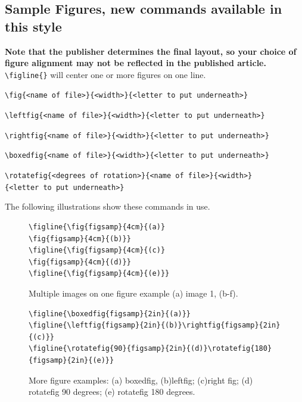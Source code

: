 \documentclass{JASA-EL}
\begin{document}
\subsection{Sample Figures, new commands available in this style}
\vskip12pt
{\bf Note that the publisher determines the final layout, so 
your choice of figure alignment may not be reflected in the published
article.}
\vskip24pt
\noindent
\verb+\figline{}+ will center one or more figures on one line. 


\noindent
\verb+\fig{<name of file>}{<width>}{<letter to put underneath>}+

\noindent
\verb+\leftfig{<name of file>}{<width>}{<letter to put underneath>}+

\noindent
\verb+\rightfig{<name of file>}{<width>}{<letter to put underneath>}+

\noindent
\verb+\boxedfig{<name of file>}{<width>}{<letter to put underneath>}+

\noindent
\verb+\rotatefig{<degrees of rotation>}{<name of file>}{<width>}+\\
\verb+{<letter to put underneath>}+

The following illustrations show these commands in use.

\begin{figure}[ht]
\begin{verbatim}
\figline{\fig{figsamp}{4cm}{(a)}
\fig{figsamp}{4cm}{(b)}}
\figline{\fig{figsamp}{4cm}{(c)}
\fig{figsamp}{4cm}{(d)}}
\figline{\fig{figsamp}{4cm}{(e)}}
\end{verbatim}


\caption{ \label{fig:pressure_field} Multiple images on one figure
example (a) image 1, (b-f).}
\end{figure}

\begin{figure}
\baselineskip=12pt
\begin{verbatim}
\figline{\boxedfig{figsamp}{2in}{(a)}}
\figline{\leftfig{figsamp}{2in}{(b)}\rightfig{figsamp}{2in}{(c)}}
\figline{\rotatefig{90}{figsamp}{2in}{(d)}\rotatefig{180}{figsamp}{2in}{(e)}}
\end{verbatim}




\caption{More figure examples: (a) boxedfig, 
(b)leftfig; (c)right fig; (d) rotatefig 90 degrees;
(e) rotatefig 180 degrees. }

\end{figure}
\end{document}
